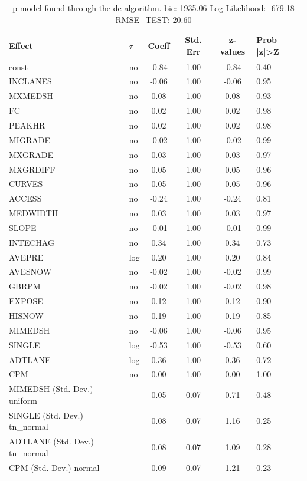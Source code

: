\begin{table}
	\caption{p model found through the de algorithm. bic: 1935.06 Log-Likelihood: -679.18 RMSE_TEST: 20.60}
	\begin{center}
		\begin{tabular}{|l|l|c|c|c|l|}
			\hline
			Effect & $\tau$ & Coeff & Std. Err & z-values & Prob |z|>Z \\
			\hline
			const & no & -0.84 & 1.00 & -0.84 & 0.40 \\
			\hline
			INCLANES & no & -0.06 & 1.00 & -0.06 & 0.95 \\
			\hline
			MXMEDSH & no & 0.08 & 1.00 & 0.08 & 0.93 \\
			\hline
			FC & no & 0.02 & 1.00 & 0.02 & 0.98 \\
			\hline
			PEAKHR & no & 0.02 & 1.00 & 0.02 & 0.98 \\
			\hline
			MIGRADE & no & -0.02 & 1.00 & -0.02 & 0.99 \\
			\hline
			MXGRADE & no & 0.03 & 1.00 & 0.03 & 0.97 \\
			\hline
			MXGRDIFF & no & 0.05 & 1.00 & 0.05 & 0.96 \\
			\hline
			CURVES & no & 0.05 & 1.00 & 0.05 & 0.96 \\
			\hline
			ACCESS & no & -0.24 & 1.00 & -0.24 & 0.81 \\
			\hline
			MEDWIDTH & no & 0.03 & 1.00 & 0.03 & 0.97 \\
			\hline
			SLOPE & no & -0.01 & 1.00 & -0.01 & 0.99 \\
			\hline
			INTECHAG & no & 0.34 & 1.00 & 0.34 & 0.73 \\
			\hline
			AVEPRE & log & 0.20 & 1.00 & 0.20 & 0.84 \\
			\hline
			AVESNOW & no & -0.02 & 1.00 & -0.02 & 0.99 \\
			\hline
			GBRPM & no & -0.02 & 1.00 & -0.02 & 0.98 \\
			\hline
			EXPOSE & no & 0.12 & 1.00 & 0.12 & 0.90 \\
			\hline
			HISNOW & no & 0.19 & 1.00 & 0.19 & 0.85 \\
			\hline
			MIMEDSH & no & -0.06 & 1.00 & -0.06 & 0.95 \\
			\hline
			SINGLE & log & -0.53 & 1.00 & -0.53 & 0.60 \\
			\hline
			ADTLANE & log & 0.36 & 1.00 & 0.36 & 0.72 \\
			\hline
			CPM & no & 0.00 & 1.00 & 0.00 & 1.00 \\
			\hline
			MIMEDSH (Std. Dev.) uniform &  & 0.05 & 0.07 & 0.71 & 0.48 \\
			\hline
			SINGLE (Std. Dev.) tn_normal &  & 0.08 & 0.07 & 1.16 & 0.25 \\
			\hline
			ADTLANE (Std. Dev.) tn_normal &  & 0.08 & 0.07 & 1.09 & 0.28 \\
			\hline
			CPM (Std. Dev.) normal &  & 0.09 & 0.07 & 1.21 & 0.23 \\
			\hline
		\end{tabular}
	\end{center}
\end{table}